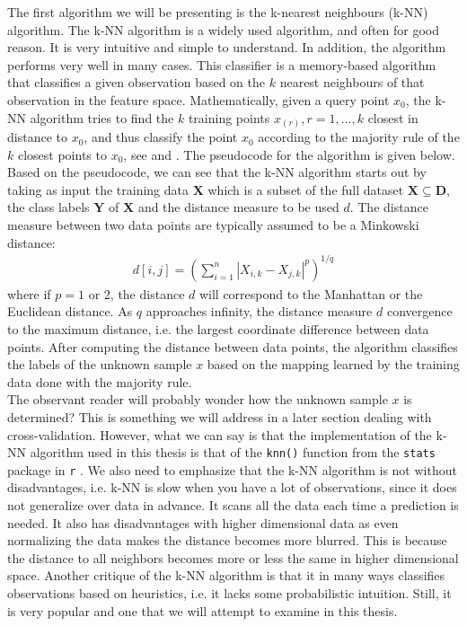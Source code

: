 \documentclass[../thesis.tex]{subfiles}
\begin{document}
\noindent The first algorithm we will be presenting is the k-nearest neighbours (k-NN) algorithm. The k-NN algorithm \citep{fix1951discriminatory} is a widely used algorithm, and often for good reason. It is very intuitive and simple to understand. In addition, the algorithm performs very well in many cases. This classifier is a memory-based algorithm that classifies a given observation based on the $k$ nearest neighbours of that observation in the feature space. Mathematically, given a query point $x_0$, the k-NN algorithm tries to find the $k$ training points $x_{(r)}, r = 1, \hdots, k$ closest in distance to $x_0$, and thus classify the point $x_0$ according to the majority rule of the $k$ closest points to $x_0$, see \citep{friedman2009elements} and \citep{james2013introduction}. The pseudocode for the algorithm is given below. Based on the pseudocode, we can see that the k-NN algorithm starts out by taking as input the training data $\mathbf{X}$ which is a subset of the full dataset ${\displaystyle \mathbf{X}\subseteq \mathbf{D}}$, the class labels $\mathbf{Y}$ of $\mathbf{X}$ and the distance measure to be used $d$. The distance measure between two data points are typically assumed to be a Minkowski distance:
\begin{align}
    d[i,j] = \left(\sum_{i=1}^n |X_{i, k} - X_{j, k}|^p\right)^{1/q}
\end{align}
where if $p=1$ or 2, the distance $d$ will correspond to the Manhattan or the Euclidean distance. As $q$ approaches infinity, the distance measure $d$ convergence to the maximum distance, i.e. the largest coordinate difference between data points. After computing the distance between data points, the algorithm classifies the labels of the unknown sample $x$ based on the mapping learned by the training data done with the majority rule.\\
\indent The observant reader will probably wonder how the unknown sample $x$ is determined? This is something we will address in a later section dealing with cross-validation. However, what we can say is that the implementation of the k-NN algorithm used in this thesis is that of the \texttt{knn()} function from the \texttt{stats} package in \texttt{r} \citep{stats}. We also need to emphasize that the k-NN algorithm is not without disadvantages, i.e.  k-NN is slow when you have a lot of observations, since it does not generalize over data in advance. It scans all the data each time a prediction is needed. It also has disadvantages with higher dimensional data as even normalizing the data makes the distance becomes more blurred. This is because the distance to all neighbors becomes more or less the same in higher dimensional space. Another critique of the k-NN algorithm is that it in many ways classifies observations based on heuristics, i.e. it lacks some probabilistic intuition. Still, it is very popular and one that we will attempt to examine in this thesis.\\
\end{document}
